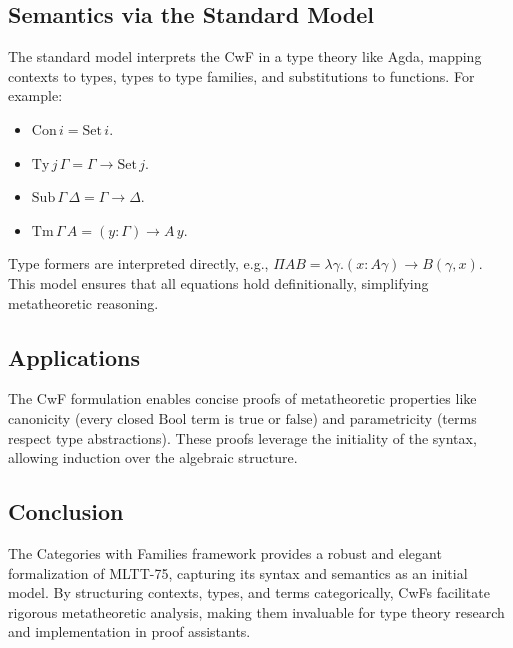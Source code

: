\documentclass{article}
\begin{document}
\subsection{Semantics via the Standard Model}
The standard model interprets the CwF in a type theory like Agda, mapping contexts to types, types to type families, and substitutions to functions. For example:
\begin{itemize}
    \item \(\mathrm{Con}\, i = \mathrm{Set}\, i\).
    \item \(\mathrm{Ty}\, j\, \Gamma = \Gamma \to \mathrm{Set}\, j\).
    \item \(\mathrm{Sub}\, \Gamma\, \Delta = \Gamma \to \Delta\).
    \item \(\mathrm{Tm}\, \Gamma\, A = (y : \Gamma) \to A\, y\).
\end{itemize}

Type formers are interpreted directly, e.g., \(\Pi A B = \lambda \gamma . (x : A \gamma) \to B (\gamma, x)\). This model ensures that all equations hold definitionally, simplifying metatheoretic reasoning.

\subsection{Applications}
The CwF formulation enables concise proofs of metatheoretic properties like canonicity (every closed \(\mathrm{Bool}\) term is \(\mathrm{true}\) or \(\mathrm{false}\)) and parametricity (terms respect type abstractions). These proofs leverage the initiality of the syntax, allowing induction over the algebraic structure.

\subsection{Conclusion}
The Categories with Families framework provides a robust and elegant formalization of MLTT-75, capturing its syntax and semantics as an initial model. By structuring contexts, types, and terms categorically, CwFs facilitate rigorous metatheoretic analysis, making them invaluable for type theory research and implementation in proof assistants.
\end{document}
